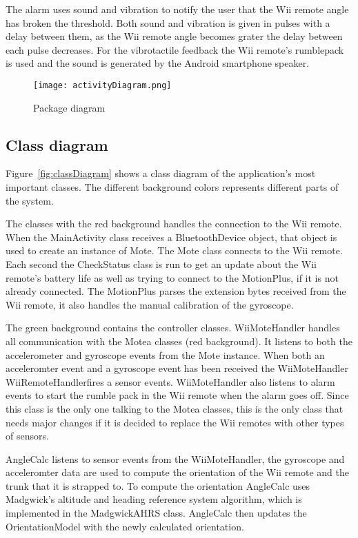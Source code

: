 The alarm uses sound and vibration to notify the user that the Wii remote angle has broken the threshold. Both sound and vibration is given in pulses with a delay between them, as the Wii remote angle becomes grater the delay between each pulse decreases. For the vibrotactile feedback the Wii remote's rumblepack is used and the sound is generated by the Android smartphone speaker. 


\begin{figure}[h!]
  \centering
    \texttt{[image: activityDiagram.png]}
    \caption{\footnotesize Package diagram}
    \label{fig:activityDiagram}
\end{figure}

\subsection{Class diagram}
Figure~\ref{fig:classDiagram} shows a class diagram of the application's most important classes. The different background colors represents different parts of the system.

The classes with the red background handles the connection to the Wii remote. When the MainActivity class receives a BluetoothDevice object, that object is used to create an instance of Mote. The Mote class connects to the Wii remote. Each second the CheckStatus class is run to get an update about the Wii remote's battery life as well as trying to connect to the MotionPlus, if it is not already connected. The MotionPlus parses the extension bytes received from the Wii remote, it also handles the manual calibration of the gyroscope.

The green background contains the controller classes. WiiMoteHandler handles all communication with the Motea classes (red background). It listens to both the accelerometer and gyroscope events from the Mote instance. When both an acceleromter event and a gyroscope event has been received the WiiMoteHandler WiiRemoteHandlerfires a sensor events. WiiMoteHandler also listens to alarm events to start the rumble pack in the Wii remote when the alarm goes off. Since this class is the only one talking to the Motea classes, this is the only class that needs major changes if it is decided to replace the Wii remotes with other types of sensors. 

AngleCalc listens to sensor events from the WiiMoteHandler, the gyroscope and acceleromter data are used to compute the orientation of the Wii remote and the trunk that it is strapped to. To compute the orientation AngleCalc uses Madgwick's altitude and heading reference system algorithm, which is implemented in the MadgwickAHRS class. AngleCalc then updates the OrientationModel with the newly calculated orientation.

